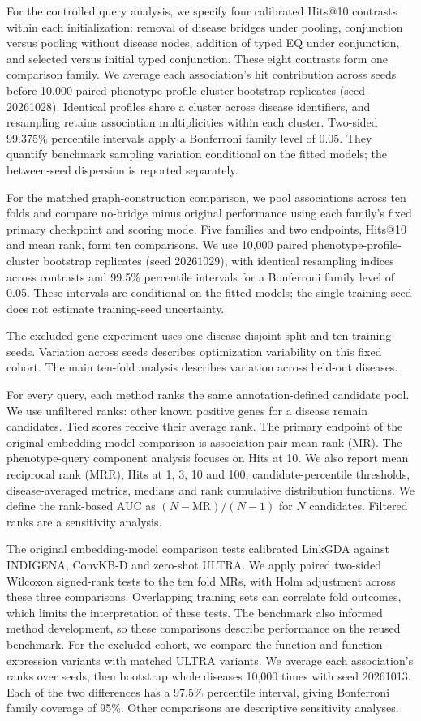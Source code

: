 \documentclass[webpdf,contemporary,large]{oup-authoring-template}%
\theoremstyle{thmstyleone}%
\theoremstyle{thmstyletwo}%
\theoremstyle{thmstylethree}%
\newcommand{\method}{LinkGDA}
\begin{document}
For the controlled query analysis, we specify four calibrated Hits@10 contrasts
within each initialization: removal of disease bridges under pooling,
conjunction versus pooling without disease nodes, addition of typed EQ under
conjunction, and selected versus initial typed conjunction. These eight
contrasts form one comparison family. We average each association's hit
contribution across seeds before 10{,}000 paired phenotype-profile-cluster
bootstrap replicates (seed 20261028). Identical profiles share a cluster across
disease identifiers, and resampling retains association multiplicities within
each cluster. Two-sided 99.375\% percentile intervals apply a Bonferroni family
level of 0.05. They quantify benchmark sampling variation conditional on the
fitted models; the between-seed dispersion is reported separately.

For the matched graph-construction comparison, we pool associations across
ten folds and compare no-bridge minus original performance using each family's
fixed primary checkpoint and scoring mode. Five families and two endpoints,
Hits@10 and mean rank, form ten comparisons. We use 10{,}000 paired
phenotype-profile-cluster bootstrap replicates (seed 20261029), with identical
resampling indices across contrasts and 99.5\% percentile intervals for a
Bonferroni family level of 0.05. These intervals are conditional on the fitted
models; the single training seed does not estimate training-seed uncertainty.

The excluded-gene experiment uses one disease-disjoint split and ten training
seeds. Variation across seeds describes optimization variability on this fixed
cohort. The main ten-fold analysis describes variation across held-out diseases.

For every query, each method ranks the same annotation-defined candidate pool.
We use unfiltered ranks: other known positive genes for a disease remain
candidates. Tied scores receive their average rank. The primary endpoint of the
original embedding-model comparison is association-pair mean rank (MR).
The phenotype-query component analysis focuses on Hits at 10. We also report
mean reciprocal rank (MRR),
Hits at 1, 3, 10 and 100, candidate-percentile thresholds, disease-averaged
metrics, medians and rank cumulative distribution functions. We define the
rank-based AUC as $(N-\mathrm{MR})/(N-1)$ for $N$ candidates. Filtered ranks
are a sensitivity analysis.

The original embedding-model comparison tests calibrated \method{} against INDIGENA,
ConvKB-D and zero-shot ULTRA. We apply paired two-sided Wilcoxon signed-rank
tests to the ten fold MRs, with Holm adjustment across these three comparisons.
Overlapping training sets can correlate fold outcomes, which limits the
interpretation of these tests. The benchmark also informed method development,
so these comparisons describe performance on the reused benchmark.
For the excluded cohort, we compare the
function and function--expression variants with matched ULTRA variants. We
average each association's ranks over seeds, then bootstrap whole diseases
10{,}000 times with seed 20261013. Each of the two differences has a 97.5\%
percentile interval, giving Bonferroni family coverage of 95\%. Other
comparisons are descriptive sensitivity analyses.
\end{document}

